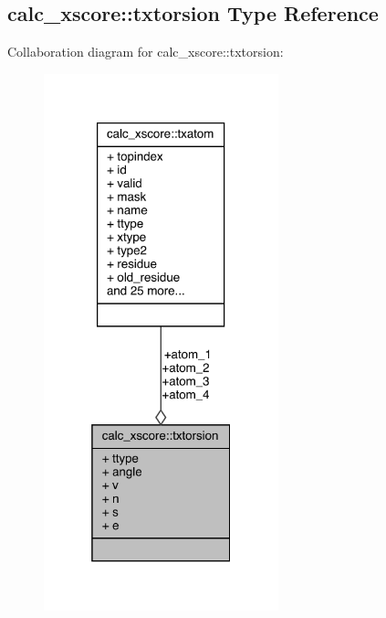 \hypertarget{structcalc__xscore_1_1txtorsion}{\subsection{calc\-\_\-xscore\-:\-:txtorsion Type Reference}
\label{structcalc__xscore_1_1txtorsion}
}


Collaboration diagram for calc\-\_\-xscore\-:\-:txtorsion\-:
\nopagebreak
\begin{figure}[H]
\begin{center}
\leavevmode
\includegraphics[width=193pt]{structcalc__xscore_1_1txtorsion__coll__graph}
\end{center}
\end{figure}

